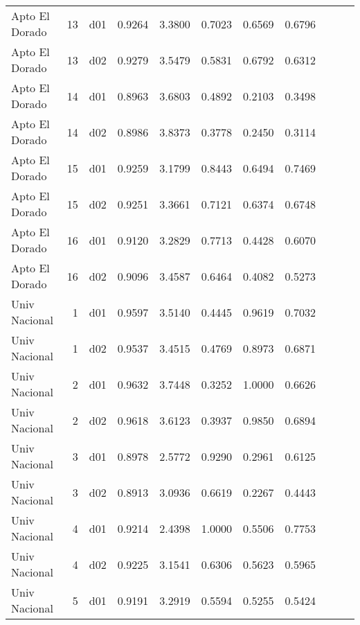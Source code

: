\begin{landscape}
\begin{longtable}{p{2cm}rrrrrrrrrr}
          Apto El Dorado  &         13 &     d01 &   0.9264 &  3.3800 &        0.7023 &           0.6569 &  0.6796 \\
          Apto El Dorado  &         13 &     d02 &   0.9279 &  3.5479 &        0.5831 &           0.6792 &  0.6312 \\
          Apto El Dorado  &         14 &     d01 &   0.8963 &  3.6803 &        0.4892 &           0.2103 &  0.3498 \\
          Apto El Dorado  &         14 &     d02 &   0.8986 &  3.8373 &        0.3778 &           0.2450 &  0.3114 \\
          Apto El Dorado  &         15 &     d01 &   0.9259 &  3.1799 &        0.8443 &           0.6494 &  0.7469 \\
          Apto El Dorado  &         15 &     d02 &   0.9251 &  3.3661 &        0.7121 &           0.6374 &  0.6748 \\
          Apto El Dorado  &         16 &     d01 &   0.9120 &  3.2829 &        0.7713 &           0.4428 &  0.6070 \\
          Apto El Dorado  &         16 &     d02 &   0.9096 &  3.4587 &        0.6464 &           0.4082 &  0.5273 \\
           Univ Nacional  &          1 &     d01 &   0.9597 &  3.5140 &        0.4445 &           0.9619 &  0.7032 \\
           Univ Nacional  &          1 &     d02 &   0.9537 &  3.4515 &        0.4769 &           0.8973 &  0.6871 \\
           Univ Nacional  &          2 &     d01 &   0.9632 &  3.7448 &        0.3252 &           1.0000 &  0.6626 \\
           Univ Nacional  &          2 &     d02 &   0.9618 &  3.6123 &        0.3937 &           0.9850 &  0.6894 \\
           Univ Nacional  &          3 &     d01 &   0.8978 &  2.5772 &        0.9290 &           0.2961 &  0.6125 \\
           Univ Nacional  &          3 &     d02 &   0.8913 &  3.0936 &        0.6619 &           0.2267 &  0.4443 \\
           Univ Nacional  &          4 &     d01 &   0.9214 &  2.4398 &        1.0000 &           0.5506 &  0.7753 \\
           Univ Nacional  &          4 &     d02 &   0.9225 &  3.1541 &        0.6306 &           0.5623 &  0.5965 \\
           Univ Nacional  &          5 &     d01 &   0.9191 &  3.2919 &        0.5594 &           0.5255 &  0.5424 \\

\end{longtable}
\end{landscape}
